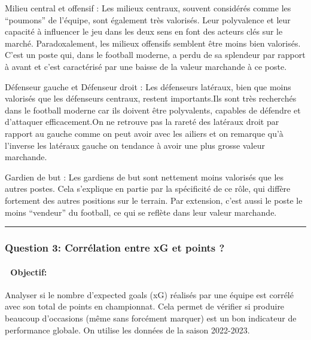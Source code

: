 \documentclass[
]{article}
\begin{document}
Milieu central et offensif : Les milieux centraux, souvent considérés
comme les ``poumons'' de l'équipe, sont également très valorisés. Leur
polyvalence et leur capacité à influencer le jeu dans les deux sens en
font des acteurs clés sur le marché. Paradoxalement, les milieux
offensifs semblent être moins bien valorisés. C'est un poste qui, dans
le football moderne, a perdu de sa splendeur par rapport à avant et
c'est caractérisé par une baisse de la valeur marchande à ce poste.

Défenseur gauche et Défenseur droit : Les défenseurs latéraux, bien que
moins valorisés que les défenseurs centraux, restent importants.Ils sont
très recherchés dans le football moderne car ils doivent être
polyvalents, capables de défendre et d'attaquer efficacement.On ne
retrouve pas la rareté des latéraux droit par rapport au gauche comme on
peut avoir avec les ailiers et on remarque qu'à l'inverse les latéraux
gauche on tendance à avoir une plus grosse valeur marchande.

Gardien de but : Les gardiens de but sont nettement moins valorisés que
les autres postes. Cela s'explique en partie par la spécificité de ce
rôle, qui diffère fortement des autres positions sur le terrain. Par
extension, c'est aussi le poste le moins ``vendeur'' du football, ce qui
se reflète dans leur valeur marchande.

\begin{center}\rule{0.5\linewidth}{0.5pt}\end{center}

\subsubsection{\texorpdfstring{\textbf{Question 3:} Corrélation entre xG
et points
?}{Question 3: Corrélation entre xG et points ?}}\label{question-3-corruxe9lation-entre-xg-et-points}

\paragraph{🎯 Objectif:}\label{objectif-2}

Analyser si le nombre d'expected goals (xG) réalisés par une équipe est
corrélé avec son total de points en championnat. Cela permet de vérifier
si produire beaucoup d'occasions (même sans forcément marquer) est un
bon indicateur de performance globale. On utilise les données de la
saison 2022-2023.
\end{document}
